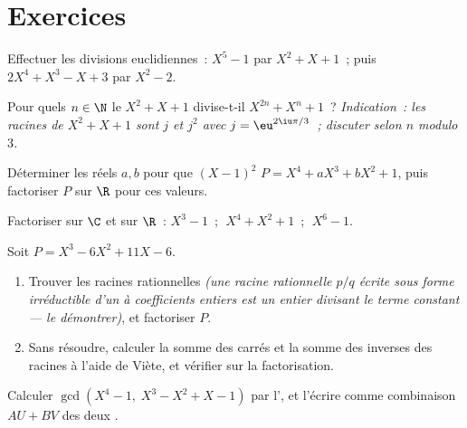 \section{Exercices}

\begin{exercise}[$\star$]\label{exo:b1:poly:1}
Effectuer les divisions euclidiennes~: $X^5 - 1$ par $X^2 + X + 1$~;
puis $2X^4 + X^3 - X + 3$ par $X^2 - 2$.
\end{exercise}

\begin{exercise}[$\star$]\label{exo:b1:poly:2}
Pour quels $n \in \N$ le  $X^2 + X + 1$ divise-t-il $X^{2n} +
X^n + 1$~?
\emph{Indication~: les racines de $X^2 + X + 1$ sont $j$ et $j^2$ avec
$j = \eu^{2\iu\pi/3}$~; discuter selon $n$ modulo $3$.}
\end{exercise}

\begin{exercise}[$\star$]\label{exo:b1:poly:3}
Déterminer les réels $a, b$ pour que $(X-1)^2$  $P = X^4 + aX^3 +
bX^2 + 1$, puis factoriser $P$ sur $\R$ pour ces valeurs.
\end{exercise}

\begin{exercise}[$\star$]\label{exo:b1:poly:4}
Factoriser sur $\C$ et sur $\R$~: $X^3 - 1$~; $\;X^4 + X^2 + 1$~;
$\;X^6 - 1$.
\end{exercise}

\begin{exercise}[$\star\star$]\label{exo:b1:poly:5}
Soit $P = X^3 - 6X^2 + 11X - 6$.
\begin{enumerate}
  \item Trouver les racines rationnelles \emph{(une racine rationnelle
        $p/q$ écrite sous forme irréductible d'un  à
        coefficients entiers est un entier divisant le terme constant
        --- le démontrer)}, et factoriser $P$.
  \item Sans résoudre, calculer la somme des carrés et la somme des
        inverses des racines à l'aide de Viète, et vérifier sur la
        factorisation.
\end{enumerate}
\end{exercise}

\begin{exercise}[$\star\star$]\label{exo:b1:poly:6}
Calculer $\gcd(X^4 - 1,\; X^3 - X^2 + X - 1)$ par l', et l'écrire comme combinaison $AU + BV$ des deux .
\end{exercise}


